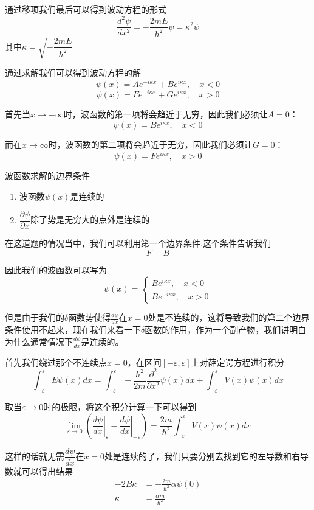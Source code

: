 \documentclass{article}
\begin{document}
通过移项我们最后可以得到波动方程的形式
\[
    \frac{d^2\psi}{dx^2}=-\frac{2mE}{\hbar^2}\psi=\kappa^2\psi
\]
其中$\displaystyle\kappa=\sqrt{-\dfrac{2mE}{\hbar^2}}$

通过求解我们可以得到波动方程的解
\[
    \psi(x)=Ae^{-i\kappa x}+Be^{i\kappa x},\quad x<0
\]
\[\psi(x)=Fe^{-i\kappa x}+Ge^{i\kappa x},\quad x>0\]

首先当$x\to-\infty$时，波函数的第一项将会趋近于无穷，因此我们必须让$A=0$：
\[
    \psi(x)=Be^{i\kappa x},\quad x<0
\]

而在$x\to\infty$时，波函数的第二项将会趋近于无穷，因此我们必须让$G=0$：
\[
    \psi(x)=Fe^{i\kappa x},\quad x>0
\]




波函数求解的边界条件
\begin{enumerate}
    \item 波函数$\psi(x)$是连续的
    \item $\dfrac{\partial\psi}{\partial x}$除了势是无穷大的点外是连续的
\end{enumerate}

在这道题的情况当中，我们可以利用第一个边界条件,这个条件告诉我们
\[F=B\]

因此我们的波函数可以写为
\begin{equation*}
    \psi(x)=
    \begin{cases}
        Be^{i\kappa x},\quad x<0\\
        Be^{-i\kappa x},\quad x>0
    \end{cases}
\end{equation*}


但是由于我们的$\delta$函数势使得$\frac{d\psi}{dx}$在$x=0$处是不连续的，这将导致我们的第二个边界条件使用不起来，现在我们来看一下$\delta$函数的作用，作为一个副产物，我们讲明白为什么通常情况下$\frac{d\psi}{dx}$是连续的。

首先我们绕过那个不连续点$x=0$，在区间$[-\varepsilon,\varepsilon]$上对薛定谔方程进行积分
\[
    \int_{-\varepsilon}^{\varepsilon}E\psi(x)dx=\int_{-\varepsilon}^{\varepsilon}-\frac{\hbar^2}{2m}\frac{\partial^2}{\partial x^2}\psi(x)dx+\int_{-\varepsilon}^{\varepsilon}V(x)\psi(x)dx
\]

取当$\varepsilon\to 0$时的极限，将这个积分计算一下可以得到
\[
    \lim_{\varepsilon\to0}\left(\left.\frac{d\psi}{dx}\right|_{\varepsilon}-\left.\frac{d\psi}{dx}\right|_{-\varepsilon}\right)=\frac{2m}{\hbar^2}\int_{-\varepsilon}^{\varepsilon}V(x)\psi(x)dx
\]

这样的话就无需$\dfrac{d\psi}{dx}$在$x=0$处是连续的了，我们只要分别去找到它的左导数和右导数就可以得出结果
\begin{align*}
    -2B\kappa&=-\frac{2m}{\hbar^2}\alpha\psi(0)\\
    \kappa&=\frac{\alpha m}{\hbar^2}
\end{align*}
\end{document}
